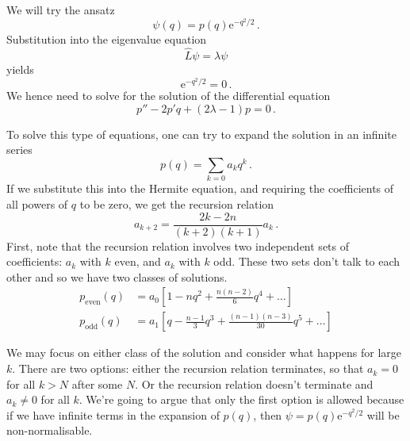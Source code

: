 \documentclass{article}
\theoremstyle{plain}\theoremheaderfont{\normalfont\itshape}\theorembodyfont{\rmfamily}\theoremseparator{.}\newtheorem*{rem}{Remark}\newtheorem*{ex}{Example}\newtheorem*{proof}{Proof}\newtheorem*{altp}{Alternative proof}
\theoremstyle{plain}\theoremheaderfont{\normalfont\bfseries}\theorembodyfont{\rmfamily}\theoremseparator{.}\newtheorem{thm}{Theorem}[section]\newtheorem{lem}[thm]{Lemma}\newtheorem{prop}[thm]{Proposition}\newtheorem*{cor}{Corollary}\newtheorem{defn}[thm]{Definition}\newtheorem{clm}[thm]{Claim}\newtheorem{clminproof}{Claim}
\theoremstyle{break}\theoremheaderfont{\normalfont\itshape}\theorembodyfont{\rmfamily}\theoremseparator{.\medskip}\newtheorem*{proofskip}{Proof}\newtheorem*{exs}{Examples}\newtheorem*{rems}{Remarks}
\theoremstyle{break}\theoremheaderfont{\normalfont\bfseries}\theorembodyfont{\rmfamily}\theoremseparator{.\medskip}\newtheorem{lemskip}[thm]{Lemma}\newtheorem{defnskip}[thm]{Definition}\newtheorem{propskip}[thm]{Proposition}\newtheorem{thmskip}[thm]{Theorem}
\numberwithin{equation}{section}
\newcommand{\ee}{\mathrm{e}}
\begin{document}
    We will try the ansatz
    \begin{equation}
        \psi(q)=p(q)\ee^{-q^2/2}\,.
    \end{equation}
    Substitution into the eigenvalue equation
    \begin{equation}
        \hat{L}\psi=\lambda\psi
    \end{equation}
    yields
    \begin{equation}
        [p''-2p'q+(2\lambda-1)p]\ee^{-q^2/2}=0\,.
    \end{equation}
    We hence need to solve for the solution of the differential equation
    \begin{equation}
        p''-2p'q+(2\lambda-1)p=0\,.
    \end{equation}
    
    To solve this type of equations, one can try to expand the solution in an infinite series
    \begin{equation}
        p(q)=\sum_{k=0} a_k q^k\,.
    \end{equation}
    If we substitute this into the Hermite equation, and requiring the coefficients of all powers of \(q\) to be zero, we get the recursion relation
    \begin{equation}
        a_{k+2}=\frac{2k-2n}{(k+2)(k+1)}a_k\,.
    \end{equation}
    First, note that the recursion relation involves two independent sets of coefficients: \(a_k\) with \(k\) even, and \(a_k\) with \(k\) odd. These two sets don't talk to each other and so we have two classes of solutions.
    \begin{align}
        p_{\text{even}}(q)&=a_0\left[1-nq^2+\frac{n(n-2)}{6}q^4+\dots\right] \\
        p_{\text{odd}}(q)&=a_1\left[q-\frac{n-1}{3}q^3+\frac{(n-1)(n-3)}{30}q^5+\dots\right]
    \end{align}

    We may focus on either class of the solution and consider what happens for large \(k\). There are two options: either the recursion relation terminates, so that \(a_k=0\) for all \(k>N\) after some \(N\). Or the recursion relation doesn't terminate and \(a_k\ne 0\) for all \(k\). We're going to argue that only the first option is allowed because if we have infinite terms in the expansion of \(p(q)\), then \(\psi=p(q)\ee^{-q^2/2}\) will be non-normalisable.
\end{document}
